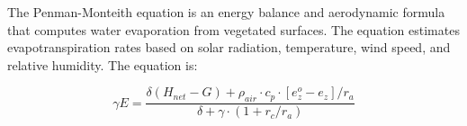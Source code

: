 The Penman-Monteith equation is an energy balance and aerodynamic formula that computes water evaporation from vegetated surfaces.  The equation estimates evapotranspiration rates based on solar radiation, temperature, wind speed, and relative humidity.  The equation is: 

\begin{equation}
	\gamma E = \frac{\delta(H_{net}-G) + \rho_{air} \cdot c_p \cdot [e_z^o-e_z]/r_a}
	{\delta + \gamma \cdot (1 + r_c/r_a)}
\end{equation}

